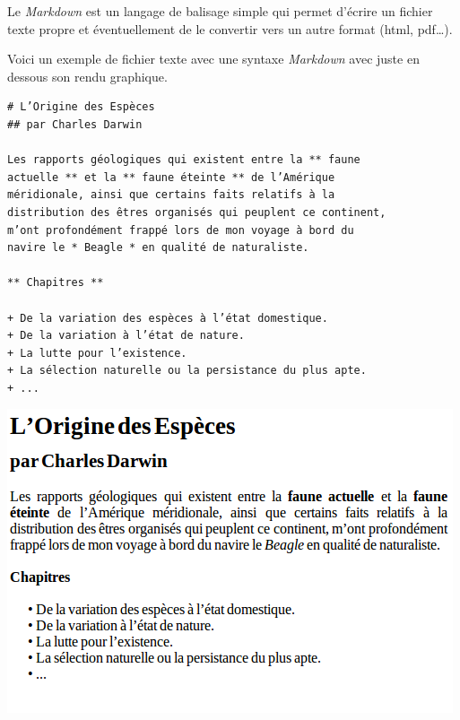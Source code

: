 \documentclass[11pt,class=report,crop=false]{standalone}
\begin{document}

\begin{cours}[Markdown]
Le \emph{Markdown} est un langage de balisage simple qui permet d'écrire un fichier texte  propre et éventuellement de le convertir vers un autre format (html, pdf\ldots).

Voici un exemple de fichier texte avec une syntaxe \emph{Markdown} avec juste en dessous son rendu graphique.
\begin{center}
\footnotesize
\begin{minipage}{0.7\textwidth}
\begin{verbatim}
# L’Origine des Espèces
## par Charles Darwin

Les rapports géologiques qui existent entre la ** faune 
actuelle ** et la ** faune éteinte ** de l’Amérique 
méridionale, ainsi que certains faits relatifs à la 
distribution des êtres organisés qui peuplent ce continent, 
m’ont profondément frappé lors de mon voyage à bord du 
navire le * Beagle * en qualité de naturaliste.

** Chapitres ** 

+ De la variation des espèces à l’état domestique.
+ De la variation à l’état de nature.
+ La lutte pour l’existence.
+ La sélection naturelle ou la persistance du plus apte.
+ ...
\end{verbatim}
\end{minipage}
\end{center}
\begin{center}
\includegraphics[scale=0.6]{ecran-markdown-1}
\end{center}



\end{cours}
\end{document}
